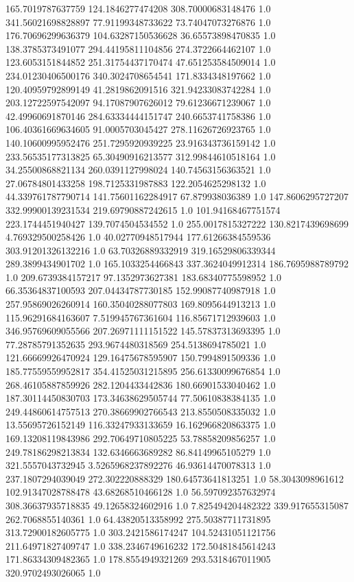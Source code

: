 165.7019787637759	124.1846277474208	308.70000683148476	1.0
341.56021698828897	77.91199348733622	73.74047073276876	1.0
176.70696299636379	104.63287150536628	36.65573898470835	1.0
138.3785373491077	294.44195811104856	274.3722664462107	1.0
123.6053151844852	251.31754437170474	47.651253584509014	1.0
234.01230406500176	340.3024708654541	171.8334348197662	1.0
120.40959792899149	41.2819862091516	321.94233083742284	1.0
203.12722597542097	94.17087907626012	79.61236671239067	1.0
42.49960691870146	284.63334444151747	240.6653741758386	1.0
106.40361669634605	91.0005703045427	278.11626726923765	1.0
140.10600995952476	251.7295920939225	23.916343736159142	1.0
233.56535177313825	65.30490916213577	312.99844610518164	1.0
34.25500868821134	260.0391127998024	140.74563156363521	1.0
27.06784801433258	198.7125331987883	122.2054625298132	1.0
44.339761787790714	141.75601162284917	67.879938036389	1.0
147.8606295727207	332.99900139231534	219.69790887242615	1.0
101.94168467751574	223.1744451940427	139.7074504534552	1.0
255.0017815327222	130.8217439698699	4.769329500258426	1.0
40.02770948517944	177.61266384559536	303.91201326132216	1.0
63.70326889332919	319.16529806339344	289.3899434901702	1.0
165.1033254466843	337.3624049912314	186.7695988789792	1.0
209.6739384157217	97.1352973627381	183.68340775598952	1.0
66.35364837100593	207.04434787730185	152.99087740987918	1.0
257.95869026260914	160.35040288077803	169.8095644913213	1.0
115.96291684163607	7.519945767361604	116.85671712939603	1.0
346.95769609055566	207.26971111151522	145.57837313693395	1.0
77.28785791352635	293.9674480318569	254.5138694785021	1.0
121.66669926470924	129.16475678595907	150.7994891509336	1.0
185.77559559952817	354.41525031215895	256.61330099676854	1.0
268.46105887859926	282.1204433442836	180.66901533040462	1.0
187.30114450830703	173.34638629505744	77.50610838384135	1.0
249.44860614757513	270.38669902766543	213.8550508335032	1.0
13.55695726152149	116.33247933133659	16.162966820863375	1.0
169.13208119843986	292.70649710805225	53.78858209856257	1.0
249.78186298213834	132.6346663689282	86.84149965105279	1.0
321.5557043732945	3.5265968237892276	46.93614470078313	1.0
237.1807294039049	272.302220888329	180.64573641813251	1.0
58.3043098961612	102.91347028788478	43.68268510466128	1.0
56.597092357632974	308.36637935718835	49.12658324602916	1.0
7.825494204482322	339.917655315087	262.7068855140361	1.0
64.43820513358992	275.50387711731895	313.72900182605775	1.0
303.2421586174247	104.52431051121756	211.64971827409747	1.0
338.2346749616232	172.50481845614243	171.86334309482365	1.0
178.8554949321269	293.5318467011905	320.9702493026065	1.0
